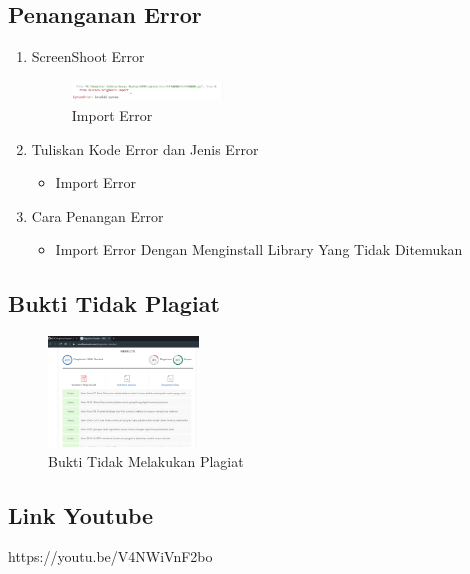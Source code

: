 \subsection{Penanganan Error}
\begin{enumerate}
	\item ScreenShoot Error
	\begin{figure}[H]
		\includegraphics[width=4cm]{figures/1174080/1/3.PNG}
		\centering
		\caption{Import Error}
	\end{figure}

	\item Tuliskan Kode Error dan Jenis Error
	\begin{itemize}
		\item Import Error
	\end{itemize}
	\item Cara Penangan Error
	\begin{itemize}
		\item Import Error
		\hfill\break
		Dengan Menginstall Library Yang Tidak Ditemukan
	\end{itemize}
\end{enumerate}

\subsection{Bukti Tidak Plagiat}
\begin{figure}[H]
	\includegraphics[width=4cm]{figures/1174080/1/4.PNG}
	\centering
	\caption{Bukti Tidak Melakukan Plagiat }
\end{figure}

\subsection{Link Youtube}
https://youtu.be/V4NWiVnF2bo
